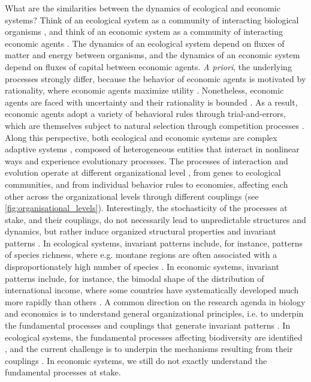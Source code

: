 What are the similarities between the dynamics of ecological and economic systems? 
% 
Think of an ecological system as a community of interacting biological organisms \citep{chapin2002principles}, and think of an economic system as a community of interacting economic agents \citep{Dopfer2007}.
% 
The dynamics of an ecological system depend on fluxes of matter and energy between organisms, and the dynamics of an economic system depend on fluxes of capital between economic agents.
% 
\textit{A priori}, the underlying processes strongly differ, because the behavior of economic agents is motivated by rationality, where economic agents maximize utility \citep{10.1093/cje/bet027}. 
% 
Nonetheless, economic agents are faced with uncertainty \citep{Foster2012} and their rationality is bounded \citep{Veblen1898,nelson1985evolutionary}. As a result, economic agents adopt a variety of behavioral rules \citep{Foster2012} through trial-and-errors, which are themselves subject to natural selection through competition processes \citep{schumpeter2017theory}.
% 
Along this perspective, both ecological and economic systems are complex adaptive systems \citep{Levin2002}, composed of heterogeneous entities that interact in nonlinear ways and experience evolutionary processes. 
% 
% 
The processes of interaction and evolution operate at different organizational level \citep{Levin1998}, from genes to ecological communities, and from individual behavior rules to economies, affecting each other across the organizational levels through different couplings (see \cref{fig:organisational_levels}).
% 
Interestingly, the stochasticity of the processes at stake, and their couplings, do not necessarily lead to unpredictable structures and dynamics, but rather induce organized structural properties and invariant patterns \citep{Olff2009,mitchell2009complexity}. 
% 
In ecological systems, invariant patterns include, for instance, patterns of species richness, where e.g. montane regions are often associated with a disproportionately high number of species \citep{Rahbek2019}. In economic systems, invariant patterns include, for instance, the bimodal shape of the distribution of international income, where some countries have systematically developed much more rapidly than others \citep{acemoglu2001colonial}. 
% 
A common direction on the research agenda in biology and economics is to understand general organizational principles, i.e.  to underpin the fundamental processes and couplings that generate invariant patterns \citep{Levin2002,Olff2009,Veldhuis2018}.
% 
In ecological systems, the fundamental processes affecting biodiversity are identified \citep{Rahbek2019a,Rangel2018,Hagen2022}, and the current challenge is to underpin the mechanisms resulting from their couplings \citep{Hagen2022}.
% 
In economic systems, we still do not exactly understand the fundamental processes at stake. 


